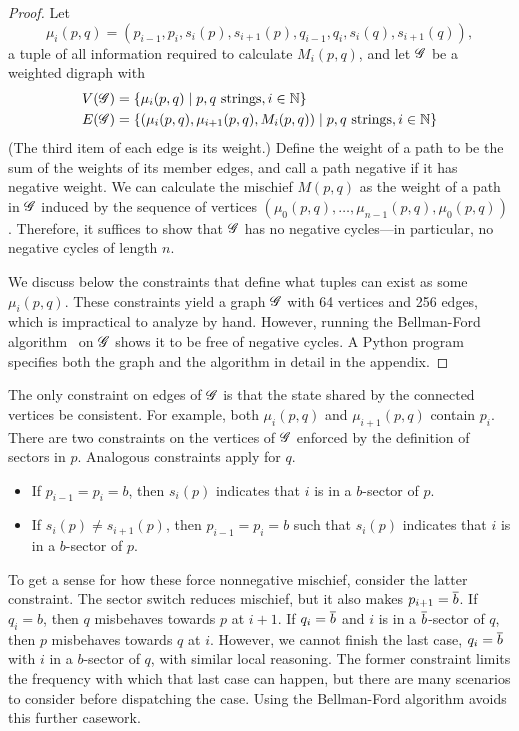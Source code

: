 \begin{proof}
Let
\[
  \mu_i(p,q) = (p_{i-1},p_i,s_i(p),s_{i+1}(p),q_{i-1},q_i,s_i(q),s_{i+1}(q)),
\]
a tuple of all information required to calculate $M_i(p,q)$, and let $\mathscr{G}$ be a
weighted digraph with
\begin{align*}
  \V[\G] &= \set{\mu_i(p,q)}{p,q \text{ strings}, i \in \nats} \\
  \E[\G] &= \set{(\mu_i(p,q),\mu_{i+1}(p,q),M_i(p,q))}{p,q \text{ strings}, i
    \in \nats}
\end{align*}
(The third item of each edge is its weight.) Define the weight of a path to be
the sum of the weights of its member edges, and call a path negative if it has
negative weight. We can calculate the mischief $M(p,q)$ as the weight of a path
in $\mathscr{G}$ induced by the sequence of vertices $(\mu_0(p,q), \dots,
\mu_{n-1}(p,q), \mu_0(p,q))$. Therefore, it suffices to show that $\mathscr{G}$ has no
negative cycles---in particular, no negative cycles of length $n$.

We discuss below the constraints that define what tuples can exist as some
$\mu_i(p,q)$. These constraints yield a graph $\mathscr{G}$ with 64 vertices and 256
edges, which is impractical to analyze by hand. However, running the
Bellman-Ford algorithm~\cite{bellmanford} on $\mathscr{G}$ shows it to be free of
negative cycles. A Python program specifies both the graph and the algorithm in
detail in the appendix.
\end{proof}

The only constraint on edges of $\mathscr{G}$ is that the state shared by the connected
vertices be consistent. For example, both $\mu_i(p,q)$ and $\mu_{i+1}(p,q)$
contain $p_i$. There are two constraints on the vertices of $\mathscr{G}$ enforced by
the definition of sectors in $p$. Analogous constraints apply for $q$.
\begin{itemize}
\item If $p_{i-1} = p_i = b$, then $s_i(p)$ indicates that $i$ is in a
  $b$-sector of $p$.
\item If $s_i(p) \neq s_{i+1}(p)$, then $p_{i-1} = p_i = b$ such that $s_i(p)$
  indicates that $i$ is in a $b$-sector of $p$.
\end{itemize}
To get a sense for how these force nonnegative mischief, consider the latter
constraint. The sector switch reduces mischief, but it also makes $p_{i+1} =
\overline{b}$. If $q_i = b$, then $q$ misbehaves towards $p$ at $i+1$. If $q_i =
\overline{b}$ and $i$ is in a $\overline{b}$-sector of $q$, then $p$ misbehaves towards $q$
at $i$. However, we cannot finish the last case, $q_i = \overline{b}$ with $i$ in a
$b$-sector of $q$, with similar local reasoning. The former constraint limits
the frequency with which that last case can happen, but there are many
scenarios to consider before dispatching the case. Using the Bellman-Ford
algorithm avoids this further casework.

